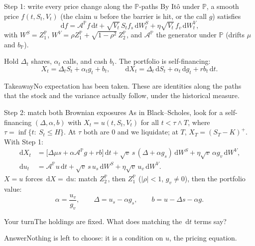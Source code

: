 \documentclass[handout,10pt,t,aspectratio=169]{beamer}
\newenvironment{pausebox}{\begin{block}{Your turn}}{\end{block}}
\newenvironment{answerbox}{\begin{exampleblock}{Answer}}{\end{exampleblock}}
\newenvironment{keybox}{\begin{exampleblock}{Takeaway}}{\end{exampleblock}}
\newcommand{\Pp}{\mathbb P}
\newcommand{\dd}{\,\mathrm d}
\begin{document}
\begin{frame}{Step 1: write every price change along the \(\Pp\)-paths}
\small
By It\^o under \(\Pp\), a smooth price \(f(t,S_t,V_t)\) (the claim \(u\) before the barrier is hit,
or the call \(g\)) satisfies
\[
\dd f=\mathcal A^\Pp f\dd t+\sqrt{V_t}\,S_tf_s\dd W_t^S+\eta\sqrt{V_t}\,f_v\dd W_t^V,
\]
with \(W^S=Z_1^\Pp\), \(W^V=\rho Z_1^\Pp+\sqrt{1-\rho^2}\,Z_2^\Pp\), and \(\mathcal A^\Pp\) the
generator under \(\Pp\) (drifts \(\mu\) and \(b_\Pp\)).

Hold \(\Delta_t\) shares, \(\alpha_t\) calls, and cash \(b_t\). The portfolio is self-financing:
\[
X_t=\Delta_tS_t+\alpha_tg_t+b_t,\qquad
\dd X_t=\Delta_t\dd S_t+\alpha_t\dd g_t+rb_t\dd t.
\]
\begin{keybox}No expectation has been taken. These are identities along the paths that
the stock and the variance actually follow, under the historical measure.\end{keybox}
\end{frame}

\begin{frame}{Step 2: match both Brownian exposures}
\small
As in Black--Scholes, look for a self-financing \((\Delta,\alpha,b)\) with
\(X_t=u(t,S_t,V_t)\) for all \(t<\tau\wedge T\), where \(\tau=\inf\{t:\ S_t\le H\}\).
At \(\tau\) both are \(0\) and we liquidate; at \(T\), \(X_T=(S_T-K)^+\). With Step 1:
\[
\begin{aligned}
\dd X_t&=\bigl[\Delta\mu s+\alpha\mathcal A^\Pp g+rb\bigr]\dd t
+\sqrt v\,s\,(\Delta+\alpha g_s)\dd W^S+\eta\sqrt v\,\alpha g_v\dd W^V,\\
\dd u_t&=\mathcal A^\Pp u\dd t+\sqrt v\,s\,u_s\dd W^S+\eta\sqrt v\,u_v\dd W^V.
\end{aligned}
\]
\(X=u\) forces \(\dd X=\dd u\): match \(Z_2^\Pp\), then \(Z_1^\Pp\)
(\(|\rho|<1\), \(g_v\ne0\)), then the portfolio value:
\[
\boxed{\alpha=\frac{u_v}{g_v},\qquad \Delta=u_s-\alpha g_s,\qquad b=u-\Delta s-\alpha g.}
\]
\begin{pausebox}The holdings are fixed. What does matching the \(\dd t\) terms say?\end{pausebox}
\begin{answerbox}Nothing is left to choose: it is a condition on \(u\), the pricing equation.\end{answerbox}
\end{frame}
\end{document}
